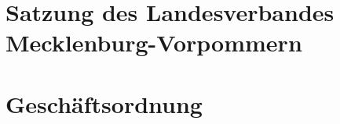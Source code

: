 \documentclass[a4paper,10pt]{scrreprt}
\begin{document}
\appendix

\chapter{Satzung des Landesverbandes Mecklenburg-Vorpommern}


%

\chapter{Geschäftsordnung}


%

\newpage
\null
\thispagestyle{empty}
\end{document}
